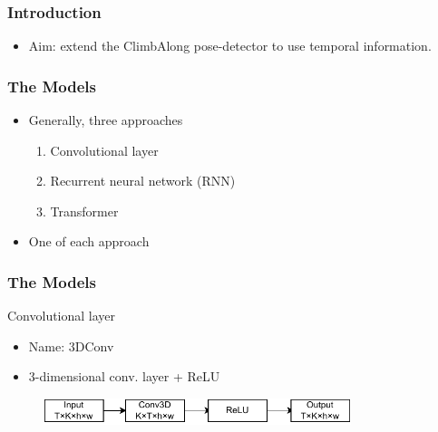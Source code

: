 \documentclass{beamer}
\begin{document}
\begin{frame}
    \frametitle{Introduction}
    \begin{itemize}
        \item<1-> Aim: extend the ClimbAlong pose-detector to use temporal information.
    \end{itemize}
\end{frame}

\begin{frame}
    \frametitle{The Models}
    \begin{itemize}
        \item<1-> Generally, three approaches
        \begin{enumerate}
            \item Convolutional layer
            \item Recurrent neural network (RNN)
            \item Transformer
        \end{enumerate}
        \item<2-> One of each approach
    \end{itemize}
    
\end{frame}

\begin{frame}
    \frametitle{The Models}
    Convolutional layer
    \begin{itemize}
        \item<1-> Name: 3DConv
        \item<1-> 3-dimensional conv. layer + ReLU
    \end{itemize}
    \begin{figure}
        \centering
        \includegraphics[width = 0.8\textwidth]{../report/entities/baseline.pdf}
    \end{figure}
\end{frame}
\end{document}
